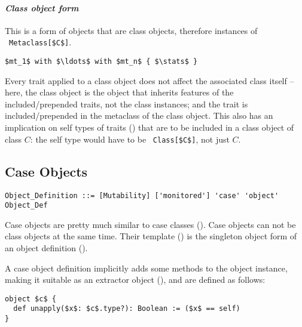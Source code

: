 \paragraph{\em Class object form}
This is a form of objects that are class objects, therefore instances of ~\lstinline!Metaclass[$C$]!. 
\begin{lstlisting}
$mt_1$ with $\ldots$ with $mt_n$ { $\stats$ }
\end{lstlisting}

Every trait applied to a class object does not affect the associated class itself -- here, the class object is the object that inherits features of the included/prepended traits, not the class instances; and the trait is included/prepended in the metaclass of the class object. This also has an implication on self types of traits () that are to be included in a class object of class $C$: the self type would have to be ~\lstinline!Class[$C$]!, not just $C$. 






\subsection{Case Objects}
\label{sec:case-objects}

\grammar\begin{lstlisting}
Object_Definition ::= [Mutability] ['monitored'] 'case' 'object' Object_Def
\end{lstlisting}

Case objects are pretty much similar to case classes (). Case objects can not be class objects at the same time. Their template () is the singleton object form of an object definition (). 

A case object definition implicitly adds some methods to the object instance, making it suitable as an extractor object (), and are defined as follows:
\begin{lstlisting}
object $c$ {
  def unapply($x$: $c$.type?): Boolean := ($x$ == self)
}
\end{lstlisting}






